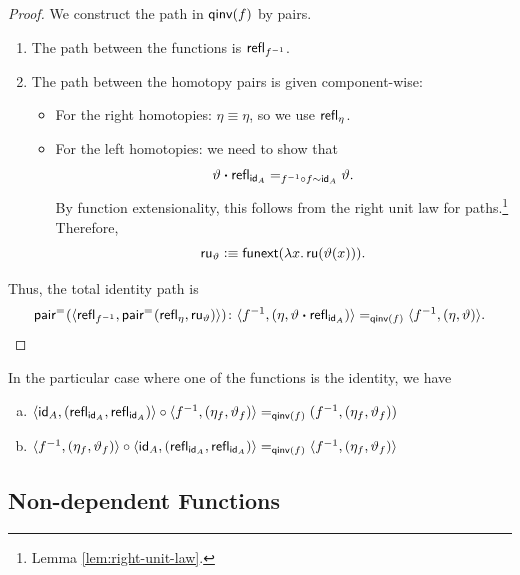 \begin{proof}
    We construct the path in $\mathsf{qinv}(f)$ by pairs.
    \begin{enumerate}[1.]
        \item The path between the functions is $\mathsf{refl}_{f^{-1}}$.
        \item The path between the homotopy pairs is given component-wise:
        \begin{itemize}
            \item For the right homotopies: $\eta \equiv \eta$, so we use $\mathsf{refl}_\eta$.
            \item For the left homotopies: we need to show that 
            \[
                \vartheta\mathbin{\boldsymbol{\cdot}}\mathsf{refl}_{\mathsf{id}_A}\mathrel{=_{f^{-1}\circ f\sim\mathsf{id}_A}}\vartheta.
            \]
            By function extensionality, this follows from the right unit law for paths.\footnote{Lemma \ref{lem:right-unit-law}.} Therefore,
            \[
                \mathsf{ru}_{\vartheta}\mathrel{\vcentcolon}\equiv
                    \mathsf{funext}(\lambda x.\,
                        \mathsf{ru}(\vartheta(x))).
            \]
        \end{itemize}
    \end{enumerate}
    Thus, the total identity path is
    \[
        \fun{pair}^{\eq{}}(\dep{\fun{refl}_{f^{-1}}
            ,\fun{pair}^{\eq{}}(\fun{refl}_\eta,\fun{ru}_{\vartheta})})
            \colon\dep{f^{-1},(\eta,\vartheta\ct\fun{refl}_{\id_A})}
            \eq{\fun{qinv}(f)}
            \dep{f^{-1},(\eta,\vartheta)}.
    \]
\end{proof}

\begin{cor}\fe\label{cor:propositional-qinv-composition-with-id}
    In the particular case where one of the functions is the identity, we have
    \begin{enumerate}[a),font=\upshape]
        \item $\langle\mathsf{id}_A,(\mathsf{refl}_{\mathsf{id}_A},\mathsf{refl}_{\mathsf{id}_A})\rangle\circ\langle f^{-1},(\eta_f,\vartheta_f)\rangle\mathrel{=_{\mathsf{qinv}(f)}}(f^{-1}
            ,(\eta_f,\vartheta_f))$

        \item $\langle f^{-1},(\eta_f,\vartheta_f)\rangle\circ\langle\mathsf{id}_A,(\mathsf{refl}_{\mathsf{id}_A},\mathsf{refl}_{\mathsf{id}_A})\rangle\mathrel{=_{\mathsf{qinv}(f)}}\langle f^{-1},(\eta_f,\vartheta_f)\rangle$
    \end{enumerate}
\end{cor}



\subsection*{Non-dependent Functions}

